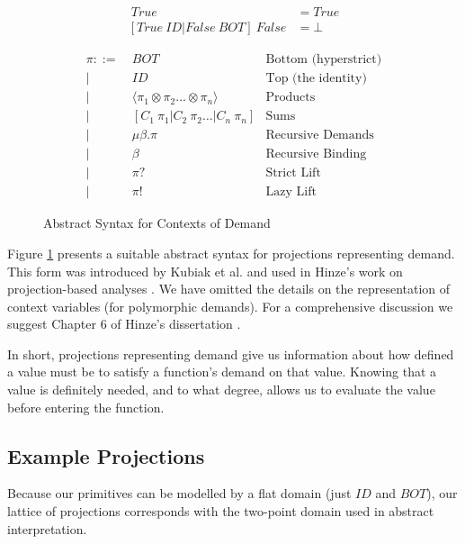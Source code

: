 \begin{align*}
[True\ ID | False\ ID]  \ True &= True \\
[True\ ID | False\ BOT] \ False &= \bot
\end{align*}

\begin{figure}
\begin{align*}
    \pi ::=&\ BOT              & \text{Bottom (hyperstrict)} \\
        |&\ ID               & \text{Top (the identity)} \\
        |&\ \langle \pi_{1} \otimes \pi_{2} \dots \otimes \pi_{n} \rangle   & \text{Products} \\ 
        |&\ [C_{1} \ \pi_{1} | C_{2} \ \pi_{2} \dots | C_{n} \ \pi_{n}]    & \text{Sums} \\ 
        |&\ \mu\beta . \pi     & \text{Recursive Demands} \\
        |&\ \beta              & \text{Recursive Binding} \\
        |&\ \pi?               & \text{Strict Lift} \\
        |&\ \pi!               & \text{Lazy Lift}
\end{align*}
\caption{Abstract Syntax for Contexts of Demand}
\label{fig:ContextAST}
\end{figure}


Figure \ref{fig:ContextAST}  presents a
suitable abstract syntax for projections representing demand.  This form was
introduced by Kubiak et al. and used in Hinze's work on projection-based
analyses \citep{kubiak, hinze1995projection}.  We have omitted the details on
the representation of context variables (for polymorphic demands). For a
comprehensive discussion we suggest Chapter 6 of Hinze's dissertation
\citep{hinze1995projection}.

In short, projections representing demand give us information about how defined
a value must be to satisfy a function's demand on that value. Knowing that a
value is definitely needed, and to what degree, allows us to evaluate the value
before entering the function.

\subsection*{Example Projections}

Because our primitives can be modelled by a flat domain (just $ID$ and $BOT$),
our lattice of projections corresponds with the two-point domain used in
abstract interpretation.

